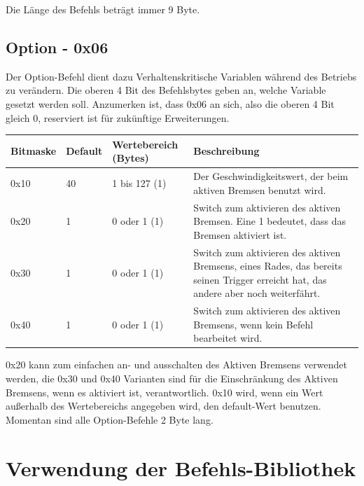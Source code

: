 \documentclass[a4paper]{article}
\begin{document}
	Die Länge des Befehls beträgt immer 9 Byte.

	\subsection{Option - 0x06}

	Der Option-Befehl dient dazu Verhaltenskritische Variablen während des Betriebs zu verändern.
	Die oberen 4 Bit des Befehlsbytes geben an, welche Variable gesetzt werden soll. Anzumerken ist,
	dass 0x06 an sich, also die oberen 4 Bit gleich 0, reserviert ist für zukünftige Erweiterungen.

	\begin{tabularx}{\linewidth}{|l|l|l|X|}
		\hline
		\textbf{Bitmaske} & \textbf{Default} & \textbf{Wertebereich (Bytes)} & \textbf{Beschreibung} \\
		\hline
		\hline
		0x10 & 40 & 1 bis 127 (1) & Der Geschwindigkeitswert, der beim aktiven Bremsen benutzt wird. \\
		\hline
		0x20 & 1 & 0 oder 1 (1) & Switch zum aktivieren des aktiven Bremsen. Eine 1 bedeutet, dass das Bremsen aktiviert ist. \\
		\hline
		0x30 & 1 & 0 oder 1 (1) & Switch zum aktivieren des aktiven Bremsens, eines Rades, das bereits seinen Trigger erreicht hat, das andere aber noch weiterfährt. \\
		\hline
		0x40 & 1 & 0 oder 1 (1) & Switch zum aktivieren des aktiven Bremsens, wenn kein Befehl bearbeitet wird. \\
		\hline
	\end{tabularx}

	0x20 kann zum einfachen an- und ausschalten des Aktiven Bremsens verwendet werden,
	die 0x30 und 0x40 Varianten sind für die Einschränkung des Aktiven Bremsens, wenn es
	aktiviert ist, verantwortlich. 0x10 wird, wenn ein Wert außerhalb des Wertebereichs
	angegeben wird, den default-Wert benutzen. Momentan sind alle Option-Befehle 2 Byte lang.
	
	\section{Verwendung der Befehls-Bibliothek}
	
\end{document}
